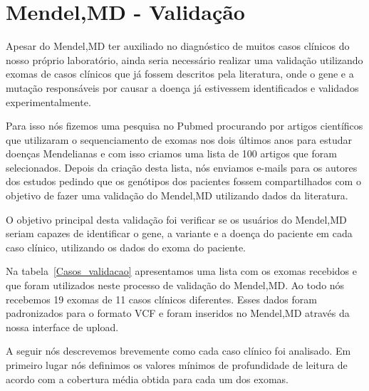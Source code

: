 \section{Mendel,MD - Validação}

Apesar do Mendel,MD ter auxiliado no diagnóstico de muitos casos clínicos do nosso próprio laboratório, ainda seria necessário realizar uma validação utilizando exomas de casos clínicos que já fossem descritos pela literatura, onde o gene e a mutação responsáveis por causar a doença já estivessem identificados e validados experimentalmente.

Para isso nós fizemos uma pesquisa no Pubmed procurando por artigos científicos que utilizaram o sequenciamento de exomas nos dois últimos anos para estudar doenças Mendelianas e com isso criamos uma lista de 100 artigos que foram selecionados. Depois da criação desta lista, nós enviamos e-mails para os autores dos estudos pedindo que os genótipos dos pacientes fossem compartilhados com o objetivo de fazer uma validação do Mendel,MD utilizando dados da literatura.

O objetivo principal desta validação foi verificar se os usuários do Mendel,MD seriam capazes de identificar o gene, a variante e a doença do paciente em cada caso clínico, utilizando os dados do exoma do paciente. 

Na tabela~\ref{Casos_validacao} apresentamos uma lista com os exomas recebidos e que foram utilizados neste processo de validação do Mendel,MD.
Ao todo nós recebemos 19 exomas de 11 casos clínicos diferentes. Esses dados foram padronizados para o formato VCF e foram inseridos no Mendel,MD através da nossa interface de upload.

A seguir nós descrevemos brevemente como cada caso clínico foi analisado. Em primeiro lugar nós definimos os valores mínimos de profundidade de leitura de acordo com a cobertura média obtida para cada um dos exomas.

